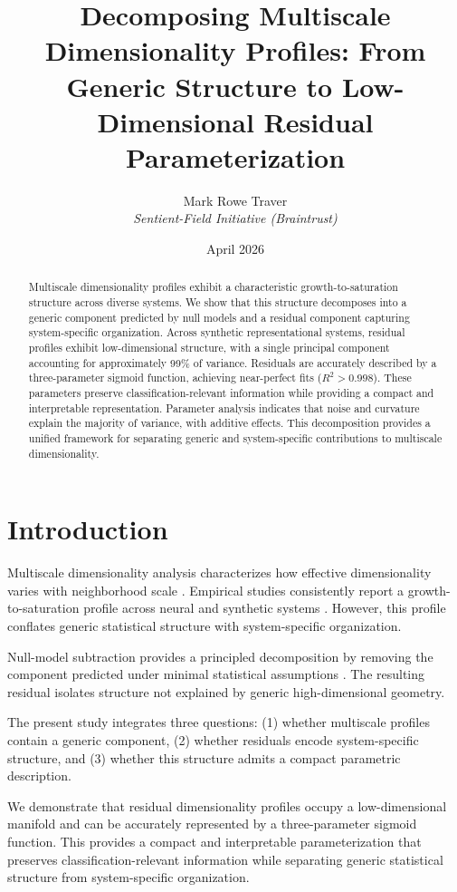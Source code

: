 \documentclass[11pt]{article}
\title{Decomposing Multiscale Dimensionality Profiles: From Generic Structure to Low-Dimensional Residual Parameterization}
\author{
Mark Rowe Traver \\
\textit{Sentient-Field Initiative (Braintrust)}
}
\date{April 2026}
\begin{document}
\maketitle

\begin{abstract}
	Multiscale dimensionality profiles exhibit a characteristic growth-to-saturation structure across diverse systems. We show that this structure decomposes into a generic component predicted by null models and a residual component capturing system-specific organization. Across synthetic representational systems, residual profiles exhibit low-dimensional structure, with a single principal component accounting for approximately 99\% of variance. Residuals are accurately described by a three-parameter sigmoid function, achieving near-perfect fits ($R^2 > 0.998$). These parameters preserve classification-relevant information while providing a compact and interpretable representation. Parameter analysis indicates that noise and curvature explain the majority of variance, with additive effects. This decomposition provides a unified framework for separating generic and system-specific contributions to multiscale dimensionality.
\end{abstract}

\section{Introduction}

Multiscale dimensionality analysis characterizes how effective dimensionality varies with neighborhood scale \citep{levina2005maximum, facco2017estimating}. Empirical studies consistently report a growth-to-saturation profile across neural and synthetic systems \citep{stringer2019high, gallego2017neural}. However, this profile conflates generic statistical structure with system-specific organization.

Null-model subtraction provides a principled decomposition by removing the component predicted under minimal statistical assumptions \citep{marchenko1967distribution, couillet2011random}. The resulting residual isolates structure not explained by generic high-dimensional geometry.

The present study integrates three questions: (1) whether multiscale profiles contain a generic component, (2) whether residuals encode system-specific structure, and (3) whether this structure admits a compact parametric description.

We demonstrate that residual dimensionality profiles occupy a low-dimensional manifold and can be accurately represented by a three-parameter sigmoid function. This provides a compact and interpretable parameterization that preserves classification-relevant information while separating generic statistical structure from system-specific organization.
\end{document}
